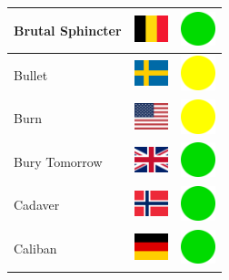 \documentclass[12pt, a4paper, twoside]{report}
\begin{document}
\begin{center}
\begin{longtable}{|p{5cm}|p{2cm}|p{2cm}|}
Brutal Sphincter & \includegraphics[width=1cm]{4x3/be} & \includegraphics[width=1cm]{likes/y} \\ \hline
Bullet & \includegraphics[width=1cm]{4x3/se} & \includegraphics[width=1cm]{likes/m} \\ \hline
Burn & \includegraphics[width=1cm]{4x3/us} & \includegraphics[width=1cm]{likes/m} \\ \hline
Bury Tomorrow & \includegraphics[width=1cm]{4x3/gb} & \includegraphics[width=1cm]{likes/y} \\ \hline
Cadaver & \includegraphics[width=1cm]{4x3/no} & \includegraphics[width=1cm]{likes/y} \\ \hline
Caliban & \includegraphics[width=1cm]{4x3/de} & \includegraphics[width=1cm]{likes/y} \\ \hline

\end{longtable}
\end{center}
\end{document}
